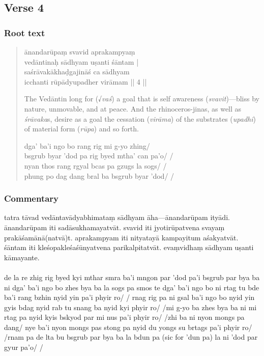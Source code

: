 \documentclass[12pt]{article}
\newcommand{\emdash} {\hspace{0em}—\hspace{0em}}
\begin{document}
\subsection{Verse 4}
\subsubsection{Root text}
\begin{quote}
	ānandarūpaṃ svavid aprakampyaṃ \\
	vedāntinaḥ sādhyam uṣanti śāntam\footnoteB{
		śāntam] \corr ; sāntam \MS\ \EDD
	} |\\
	saśrāvakākhaḍgajināś ca sādhyam\\
	icchanti rūpādyupadher virāmam || 4 ||

	The Vedāntin long for (√\emph{vaś}) a goal that is self awareness (\emph{svavit})\emdash bliss by nature, unmovable, and at peace. And the rhinoceros-jinas, as well as \emph{śrāvaka}s, desire as a goal the cessation (\emph{virāma}) of the substrates (\emph{upadhi}) of material form (\emph{rūpa}) and so forth.

	dga' ba'i ngo bo rang rig mi g-yo zhing/ \\
	bsgrub byar 'dod pa rig byed mtha' can pa'o/ /\\
	nyan thos rang rgyal bcas pa gzugs la sogs/ /\\
	phung po dag dang bral ba bsgrub byar 'dod/ /
\end{quote}

\subsubsection{Commentary}
tatra tāvad vedāntavādyabhimataṃ sādhyam āha\emdash ānandarūpam ityādi.
ānandarūpam iti sadāsukhamayatvāt.
svavid iti jyotirūpatvena svayaṃ prakāśamānā(natvā)t.
aprakampyam iti nityatayā kampayitum aśakyatvāt.
śāntam\footnoteB{
	śāntam] \corr ; sāntam \MS\ \EDD
} iti kleśopakleśaśūnyatvena parikalpitatvāt.
evaṃvidhaṃ sādhyam uṣanti kāmayante.\\

\textbf{\TVA}\\
de la re zhig rig byed kyi mthar smra ba'i mngon par 'dod pa'i bsgrub par bya ba ni dga' ba'i ngo bo zhes bya ba la sogs pa smos te dga' ba'i ngo bo ni rtag tu bde ba'i rang bzhin nyid yin pa'i phyir ro/ / rnag rig pa ni gsal ba'i ngo bo nyid yin gyis bdag nyid rab tu snang ba nyid kyi phyir ro/ /mi g-yo ba zhes bya ba ni mi rtag pa nyid kyis bskyod par mi nus pa'i phyir ro/ /zhi ba ni nyon mongs pa dang/ nye ba'i nyon mongs pas stong pa nyid du yongs su brtags pa'i phyir ro/ /rnam pa de lta bu bsgrub par bya ba la bdun pa (sic for 'dun pa) la ni 'dod par gyur pa'o/ /\\
\end{document}
